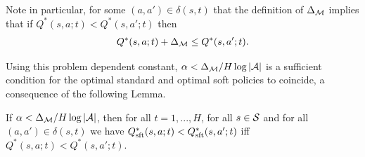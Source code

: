     Note in particular, for some $(a,a')\in\delta(s,t)$ that the definition of $\Delta_{\mathcal{M}}$ implies that if $Q^*(s,a;t)<Q^*(s,a';t)$ then 
    \begin{align}
        Q^*(s,a;t)+\Delta_{\mathcal{M}}\leq Q^*(s,a';t). \label{appeq:delta_diff}
    \end{align}






    
    Using this problem dependent constant, $\alpha < \Delta_{\mathcal{M}} / H\log |\mathcal{A}|$ is a sufficient condition for the optimal standard and optimal soft policies to coincide, a consequence of the following Lemma.

    \begin{lemma} \label{lem:soft_standard_consistent_order}
        If $\alpha < \Delta_{\mathcal{M}} / H\log |\mathcal{A}|$, then for all $t=1,...,H$, for all $s\in\mathcal{S}$ and for all $(a,a')\in\delta(s,t)$ we have $Q_{\textnormal{sft}}^*(s,a;t)<Q_{\textnormal{sft}}^*(s,a';t)$ iff $Q^*(s,a;t) < Q^*(s,a';t)$.
    \end{lemma}
